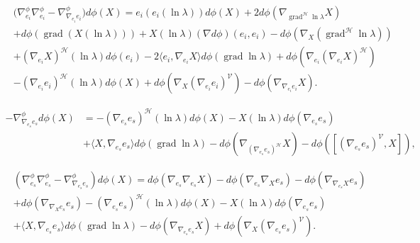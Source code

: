 \documentclass[12pt]{article}
\begin{document}
\begin{align*}
&\big( \nabla^{\phi}_{e_{i}} \nabla^{\phi}_{e_{i}} -
\nabla^{\phi}_{\nabla_{e_{i}}e_{i}}\big) d\phi(X) =
e_{i}(e_{i}(\ln \lambda)) d\phi(X) + 2 d\phi(\nabla_{\operatorname{grad}^{\mathcal{H}} \ln\lambda} X) \\
&+ d\phi(\operatorname{grad} (X(\ln\lambda))) 
+ X(\ln\lambda)(\nabla d\phi)(e_{i},e_{i}) -d\phi(\nabla_{X} (\operatorname{grad}^{\mathcal{H}}\ln\lambda)) \\
&+ (\nabla_{e_{i}}X)^{\mathcal{H}} (\ln\lambda)d\phi(e_{i}) 
- 2\langle e_{i},\nabla_{e_{i}}X \rangle d\phi(\operatorname{grad}\ln\lambda)
 + d\phi(\nabla_{e_{i}}(\nabla_{e_{i}}X)^{\mathcal{H}})\\
&- (\nabla_{e_{i}}e_{i})^{\mathcal{H}} (\ln \lambda) d\phi(X) +
d\phi(\nabla_{X}(\nabla_{e_{i}}e_{i})^{\mathcal{V}} ) - d\phi(\nabla_{\nabla_{e_{i}}e_{i}}X).
\end{align*}

\begin{align*}
- \nabla^{\phi}_{\nabla_{e_{s}}e_{s}} d\phi(X) &= - (\nabla_{e_{s}}e_{s} )^{\mathcal{H}} (\ln
\lambda) d\phi(X)- X(\ln \lambda) d\phi(\nabla_{e_{s}}e_{s})\\
&+ \langle X, \nabla_{e_{s}}e_{s} \rangle d\phi(\operatorname{grad}\ln\lambda)  
- d\phi ( \nabla_{(\nabla_{e_{s}}e_{s})^{\mathcal{H}}} X ) - d\phi
([(\nabla_{e_{s}}e_{s})^{\mathcal{V}},X]),
\end{align*}

\begin{align*}
&(\nabla^{\phi}_{e_{s}} \nabla^{\phi}_{e_{s}} - \nabla^{\phi}_{\nabla_{e_{s}}e_{s}})
d\phi(X) = d\phi(\nabla_{e_{s}}\nabla_{e_{s}} X) - d\phi(\nabla_{e_{s}}\nabla_{X}
e_{s})  - d\phi(\nabla_{\nabla_{e_{s}}X}e_{s})\\
&+ d\phi(\nabla_{\nabla_{X}e_{s}}e_{s}) 
- (\nabla_{e_{s}}e_{s} )^{\mathcal{H}} (\ln \lambda) d\phi(X) - X(\ln \lambda)
d\phi(\nabla_{e_{s}}e_{s})\\
& + \langle X, \nabla_{e_{s}}e_{s} \rangle
d\phi(\operatorname{grad}\ln\lambda)- d\phi (\nabla_{\nabla_{e_{s}}e_{s}}X) 
+ d\phi (\nabla_{X}(\nabla_{e_{s}}e_{s})^{\mathcal{V}}).
\end{align*}
\end{document}
